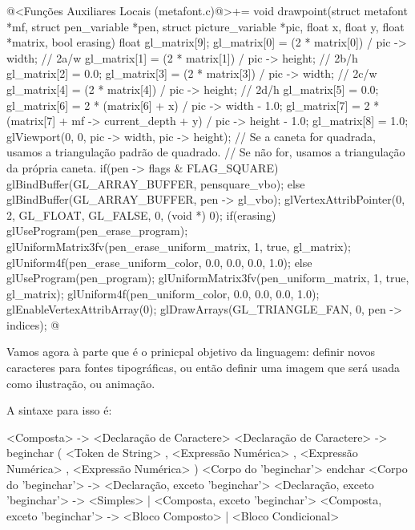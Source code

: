 {{{{{{\iniciocodigo
@<Funções Auxiliares Locais (metafont.c)@>+=
void drawpoint(struct metafont *mf, struct pen_variable *pen,
               struct picture_variable *pic, float x, float y, float *matrix,
               bool erasing){
  float gl_matrix[9];
  gl_matrix[0] = (2 * matrix[0]) /  pic -> width;  // 2a/w
  gl_matrix[1] = (2 * matrix[1]) /  pic -> height; // 2b/h
  gl_matrix[2] = 0.0;
  gl_matrix[3] = (2 * matrix[3]) /  pic -> width;  // 2c/w
  gl_matrix[4] = (2 * matrix[4]) /  pic -> height; // 2d/h
  gl_matrix[5] = 0.0;
  gl_matrix[6] = 2 * (matrix[6] + x) /  pic -> width - 1.0;
  gl_matrix[7] = 2 * (matrix[7] + mf -> current_depth + y) / pic -> height -
                 1.0;
  gl_matrix[8] = 1.0;
  glViewport(0, 0, pic -> width, pic -> height); 
  // Se a caneta for quadrada, usamos a triangulação padrão de quadrado.
  // Se não for, usamos a triangulação da própria caneta.
  if(pen -> flags & FLAG_SQUARE)
    glBindBuffer(GL_ARRAY_BUFFER, pensquare_vbo);
  else 
    glBindBuffer(GL_ARRAY_BUFFER, pen -> gl_vbo);
  glVertexAttribPointer(0, 2, GL_FLOAT, GL_FALSE, 0, (void *) 0);
  if(erasing){
    glUseProgram(pen_erase_program);
    glUniformMatrix3fv(pen_erase_uniform_matrix, 1, true, gl_matrix);
    glUniform4f(pen_erase_uniform_color, 0.0, 0.0, 0.0, 1.0);
  }
  else{
    glUseProgram(pen_program);
    glUniformMatrix3fv(pen_uniform_matrix, 1, true, gl_matrix);
    glUniform4f(pen_uniform_color, 0.0, 0.0, 0.0, 1.0);
  }
  glEnableVertexAttribArray(0);
  glDrawArrays(GL_TRIANGLE_FAN, 0, pen -> indices);
}
@
\fimcodigo


Vamos agora à parte que é o prinicpal objetivo da linguagem: definir
novos caracteres para fontes tipográficas, ou então definir uma imagem
que será usada como ilustração, ou animação.

A sintaxe para isso é:

\alinhaverbatim
<Composta> -> <Declaração de Caractere>
<Declaração de Caractere> -> beginchar ( <Token de String> ,
                                         <Expressão Numérica> ,
                                         <Expressão Numérica> ,
                                         <Expressão Numérica> )
                             <Corpo do 'beginchar'>
                             endchar
<Corpo do 'beginchar'> -> <Declaração, exceto 'beginchar'>
<Declaração, exceto 'beginchar'> -> <Simples> | <Composta, exceto 'beginchar'>
<Composta, exceto 'beginchar'> -> <Bloco Composto> | <Bloco Condicional>
\alinhanormal

}}}}}}
